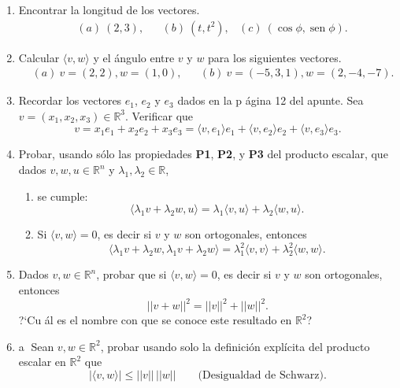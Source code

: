 \begin{enumerate}[topsep=6pt, itemsep=.4cm]
\item Encontrar la longitud de los vectores.
\begin{align*}
&(a) \ (2,3), && (b) \ (t,t^2), & (c) \ (\cos\phi,\operatorname{sen}\phi).
\end{align*}


\item Calcular $\langle v , w  \rangle$ y el { á}ngulo entre $v$ y $w$  para los siguientes vectores.
\begin{align*}
&(a) \ v=(2,2), w=(1,0), &&  (b) \  v=(-5,3,1), w=(2,-4,-7).
\end{align*}


\item Recordar los vectores $e_1$, $e_2$ y $e_3$ dados en la p ágina 12 del apunte. Sea $v=(x_1,x_2,x_3)\in\mathbb{R}^3$.  Verificar que
$$v=x_1e_1+x_2e_2+x_3e_3=\langle v,e_1\rangle e_1+\langle v,e_2\rangle e_2+\langle v,e_3\rangle e_3.$$


\item Probar, usando sólo las propiedades \textbf{P1}, \textbf{P2}, y \textbf{P3} del producto escalar, que dados $v, w, u \in \mathbb R^n$ y $\lambda_1, \lambda_2 \in \mathbb R$,
\begin{enumerate}
    \item se cumple:
    \begin{equation*}
    \langle \lambda_1 v + \lambda_2 w , u  \rangle =  \lambda_1\langle v , u  \rangle +   \lambda_2\langle w , u  \rangle.
    \end{equation*}
    \item Si $\langle v , w  \rangle =0$, es decir si $v$ y $w$ son ortogonales,  entonces
    \begin{equation*}
        \langle \lambda_1 v + \lambda_2 w ,  \lambda_1 v + \lambda_2 w   \rangle =
        \lambda_1^2 \langle  v ,  v  \rangle + \lambda_2^2 \langle w,w  \rangle.
    \end{equation*}
\end{enumerate}



\item Dados $v, w\in \mathbb R^n$, probar que si  $\langle v , w  \rangle =0$, es decir si $v$ y $w$ son ortogonales,  entonces
    \begin{equation*}
    ||v + w||^2 = ||v||^2 + ||w||^2.
    \end{equation*}
    ?`Cu ál es el nombre con que se conoce este resultado en $\mathbb R^2$?


\item\label{Schwarz} \textcircled{a} Sean $v,w\in \mathbb R^2$, probar usando  solo la definición explícita del producto escalar en $\mathbb R^2$ que
\begin{equation*}
    |\langle v , w  \rangle| \le ||v||\,||w|| \qquad \text{(Desigualdad de Schwarz).}
\end{equation*}

\end{enumerate}

